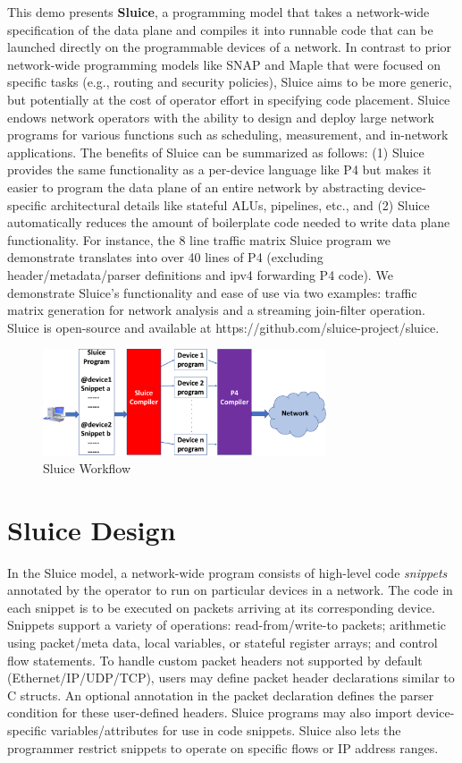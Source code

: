 This demo presents \textbf{Sluice}, a programming model that takes a
network-wide specification of the data plane and compiles it into runnable code
that can be launched directly on the programmable devices of a network. In
contrast to prior network-wide programming models like SNAP and Maple that were
focused on specific tasks (e.g., routing and security policies), Sluice aims to
be more generic, but potentially at the cost of operator effort in specifying code placement.
Sluice endows network operators with the ability to design and deploy large
network programs for various functions such as scheduling, measurement, and in-network applications.  The benefits of Sluice can be summarized as follows: (1) Sluice provides the same functionality as a per-device language like P4 but makes it easier to program the data plane of an entire network by abstracting device-specific architectural details like stateful ALUs, pipelines, etc., and (2) Sluice automatically reduces the amount of boilerplate code needed to write data plane functionality. For instance, the 8 line traffic matrix Sluice program we demonstrate translates into over 40 lines of P4 (excluding header/metadata/parser definitions and ipv4 forwarding P4 code). We demonstrate Sluice's functionality and ease of use via two examples: traffic matrix generation for network analysis and a streaming join-filter operation. Sluice is open-source and available at https://github.com/sluice-project/sluice.
\begin{figure}[tp]
\centering
\includegraphics[width=84mm,scale=0.7]{figures/sluice_workflow}
\caption{Sluice Workflow}
\vspace{-10mm}
\end{figure}
\vspace{-4mm}

\section{Sluice Design}
In the Sluice model, a network-wide program consists of high-level code
\textit{snippets} annotated by the operator to run on particular devices in a
network. The code in each snippet is to be executed on packets arriving at its corresponding device. Snippets support a variety of operations:
read-from/write-to packets; arithmetic using packet/meta data, local variables, or
stateful register arrays; and control flow statements. To handle custom packet headers not supported by default (Ethernet/IP/UDP/TCP), users may
define packet header declarations similar to C structs. An optional annotation in the packet declaration defines the parser condition for these user-defined headers. Sluice programs may also import
device-specific variables/attributes for use in code snippets. Sluice also lets
the programmer restrict snippets to operate on specific flows or IP address
ranges.


